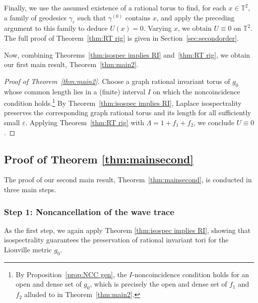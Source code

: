 \documentclass[11pt,letterpaper,oneside]{amsart}
\newcommand{\T}{\mathbb{T}}
\renewcommand{\epsilon}{\varepsilon}
\theoremstyle{definition}
\theoremstyle{remark}
\newcommand{\eps}{\varepsilon}
\theoremstyle{definition}
\theoremstyle{remark}
\begin{document}
\medskip

Finally, we use the assumed existence of a rational torus to find, for each $x \in \T^2$, a family of geodesics $\gamma_\eps$ such that $\gamma^{(0)}$ contains $x$, and apply the preceding argument to this family to deduce $U(x) = 0$. Varying $x$, we obtain $U \equiv 0$ on $\T^2$. The full proof of Theorem~\ref{thm:RT rig} is given in Section~\ref{sec:secondorder}.

\medskip 

Now, combining Theorems~\ref{thm:isospec implies RI} and~\ref{thm:RT rig}, we obtain our first main result, Theorem~\ref{thm:main2}.

\begin{proof}[Proof of Theorem~\ref{thm:main2}] 
Choose a graph rational invariant torus of \(g_0\) whose common length lies in a (finite) interval \(I\) on which the noncoincidence condition holds.\footnote{By Proposition~\ref{prop:NCC gen}, the $I$-noncoincidence condition holds for an open and dense set of $g_0$, which is precisely the open and dense set of $f_1$ and $f_2$ alluded to in Theorem~\ref{thm:main2}.} By Theorem~\ref{thm:isospec implies RI}, Laplace isospectrality preserves the corresponding graph rational torus and its length for all sufficiently small \(\epsilon\). Applying Theorem~\ref{thm:RT rig} with \(\Lambda=1+f_1+f_2\), we conclude \(U\equiv0\).
\end{proof}



\subsection{Proof of Theorem \ref{thm:mainsecond}} \label{subsec:proof2}
The proof of our second main result, Theorem~\ref{thm:mainsecond}, is conducted in three main steps.

\subsubsection*{Step 1: Noncancellation of the wave trace} As the first step, we again apply Theorem \ref{thm:isospec implies RI}, showing that isospectrality guarantees the preservation of rational invariant tori for the Liouville metric $g_0$. 
  
\end{document}
